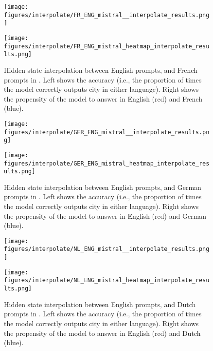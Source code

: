 \begin{figure}[h]
\begin{minipage}{0.49\textwidth}
    \centering
    \texttt{[image: figures/interpolate/FR\_ENG\_mistral\_\_interpolate\_results.png]} 
\end{minipage}
\begin{minipage}{0.49\textwidth}
    \centering
    \texttt{[image: figures/interpolate/FR\_ENG\_mistral\_heatmap\_interpolate\_results.png]} 
\end{minipage}
\caption{Hidden state interpolation between English prompts, and French prompts in \mistral. Left shows the accuracy (i.e., the proportion of times the model correctly outputs city in either language). Right shows the propensity of the model to answer in English (red) and French (blue). }
\end{figure}


\begin{figure}[h]
\begin{minipage}{0.49\textwidth}
    \centering
    \texttt{[image: figures/interpolate/GER\_ENG\_mistral\_\_interpolate\_results.png]} 
\end{minipage}
\begin{minipage}{0.49\textwidth}
    \centering
    \texttt{[image: figures/interpolate/GER\_ENG\_mistral\_heatmap\_interpolate\_results.png]} 
\end{minipage}
\caption{Hidden state interpolation between English prompts, and German prompts in \mistral. Left shows the accuracy (i.e., the proportion of times the model correctly outputs city in either language). Right shows the propensity of the model to answer in English (red) and German (blue). }
\end{figure}


\begin{figure}[h]
\begin{minipage}{0.49\textwidth}
    \centering
    \texttt{[image: figures/interpolate/NL\_ENG\_mistral\_\_interpolate\_results.png]} 
\end{minipage}
\begin{minipage}{0.49\textwidth}
    \centering
    \texttt{[image: figures/interpolate/NL\_ENG\_mistral\_heatmap\_interpolate\_results.png]} 
\end{minipage}
\caption{Hidden state interpolation between English prompts, and Dutch prompts in \mistral. Left shows the accuracy (i.e., the proportion of times the model correctly outputs city in either language). Right shows the propensity of the model to answer in English (red) and Dutch (blue). }
\end{figure}


